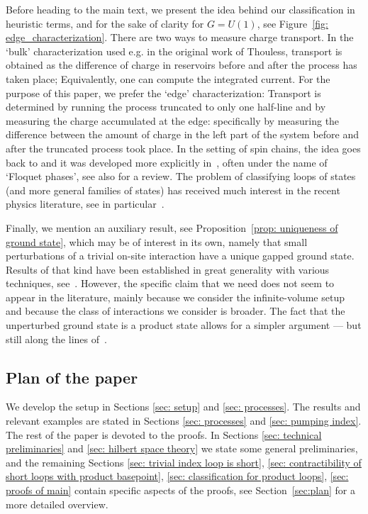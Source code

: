 Before heading to the main text, we present the idea behind our classification in heuristic terms, and for the sake of clarity for $G=U(1)$, see Figure~\ref{fig: edge_characterization}. There are two ways to measure charge transport. In the `bulk' characterization used e.g. in the original work of Thouless, transport is obtained as the difference of charge in reservoirs before and after the process has taken place; Equivalently, one can compute the integrated current. For the purpose of this paper, we prefer the `edge' characterization: Transport is determined by running the process truncated to only one half-line and by measuring the charge accumulated at the edge: specifically by measuring the difference between the amount of charge in the left part of the system before and after the truncated process took place.  In the setting of spin chains, the idea goes back to \cite{KitaevConf} and it was developed more explicitly in~\cite{Else_2014,Else_2016,potter2016classification,von2016phase}, often under the name of `Floquet phases', see also \cite{Xiong_2018} for a review. The problem of classifying loops of states (and more general families of states) has received much interest in the recent physics literature, see in particular~\cite{KunoHatsugai,kapustin2022local,wen2021flow,aasen2022adiabatic,shiozaki2022adiabatic}. 

Finally, we mention an auxiliary result, see Proposition~\ref{prop: uniqueness of ground state}, which may be of interest in its own, namely that small perturbations of a trivial on-site interaction have a unique gapped ground state. Results of that kind have been established in great generality with various techniques, see~\cite{yarotsky2006ground,bravyi2010topological,michalakis2013stability,nachtergaele2020quasi,del2021lie}. However, the specific claim that we need does not seem to appear in the literature, mainly because we consider the infinite-volume setup and because the class of interactions we consider is broader. The fact that the unperturbed ground state is a product state allows for a simpler argument --- but still along the lines of~\cite{michalakis2013stability}.

%
%
%
\subsection*{Plan of the paper} We develop the setup in Sections \ref{sec: setup} and \ref{sec: processes}. The results and relevant examples are stated in Sections \ref{sec: processes} and \ref{sec: pumping index}.  The rest of the paper is devoted to the proofs. In Sections \ref{sec: technical preliminaries} and \ref{sec: hilbert space theory} we state some general preliminaries, and the remaining Sections \ref{sec: trivial index loop is short}, \ref{sec: contractibility of short loops with product basepoint}, \ref{sec: classification for product loops}, \ref{sec: proofs of main} contain specific aspects of the proofs, see Section~\ref{sec:plan} for a more detailed overview.



